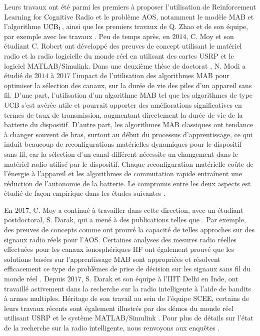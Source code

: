 \begin{resume_fr}
Leurs travaux ont été parmi les premiers à proposer l'utilisation de Reinforcement Learning for Cognitive Radio et le problème AOS, notamment le modèle MAB et l'algorithme $\mathrm{UCB}_1$,
ainsi que les premiers travaux de Q. Zhao et de son équipe, par exemple avec les travaux \cite{Liu08,Zhao10}.
%
Peu de temps après, en $2014$, C. Moy et son étudiant C. Robert \cite{RobertSDR2014,MoyWSR2014,MoyWSR2014} ont développé des preuves de concept utilisant le matériel radio et la radio logicielle du monde réel en utilisant des cartes USRP et le logiciel MATLAB/Simulink.
Dans une deuxième thèse de doctorat \cite{Modi17PhD}, N. Modi a étudié de $2014$ à $2017$ l'impact de l'utilisation des algorithmes MAB pour optimiser la sélection des canaux, sur la durée de vie des piles d'un appareil sans fil.
D'une part, l'utilisation d'un algorithme MAB tel que les algorithmes de type UCB s'est avérée utile et pourrait apporter des améliorations significatives en termes de taux de transmission, augmentant directement la durée de vie de la batterie du dispositif.
D'autre part, les algorithmes MAB classiques ont tendance à changer souvent de bras, surtout au début du processus d'apprentissage, ce qui induit beaucoup de reconfigurations matérielles dynamiques pour le dispositif sans fil, car la sélection d'un canal différent nécessite un changement dans le matériel radio utilisé par le dispositif.
Chaque reconfiguration matérielle coûte de l'énergie à l'appareil et les algorithmes de commutation rapide entraînent une réduction de l'autonomie de la batterie.
Le compromis entre les deux aspects est étudié de façon empirique dans les études suivantes
\cite{modiDemo2016}.


En $2017$, C. Moy a continué à travailler dans cette direction, avec un étudiant postdoctoral, S. Darak, qui a mené à des publications telles que
\cite{darak2016bayesian,Darak16}.
%
Par exemple, des preuves de concepts comme \cite{kumar2016two} ont prouvé la capacité de telles approches sur des signaux radio réels pour l'AOS.
%
Certaines analyses des mesures radio réelles effectuées pour les canaux ionosphériques HF ont également prouvé que les solutions basées sur l'apprentissage MAB sont appropriées et résolvent efficacement ce type de problèmes de prise de décision sur les signaux sans fil du monde réel \cite{Melian15}.
%
Depuis $2017$, S. Darak et son équipe à l'IIIT Delhi en Inde, ont travaillé activement dans la recherche sur la radio intelligente à l'aide de bandits à armes multiples.
Héritage de son travail au sein de l'équipe SCEE,
certains de leurs travaux récents sont également illustrés par des démos du monde réel utilisant USRP et le système MATLAB/Simulink
\cite{KumarYadav2018,SawantKumar2018,JoshiKumar2018}.
%
Pour plus de détails sur l'état de la recherche sur la radio intelligente, nous renvoyons aux enquêtes \cite{garhwal2012survey,marinho2012cognitive}.



\end{resume_fr}
